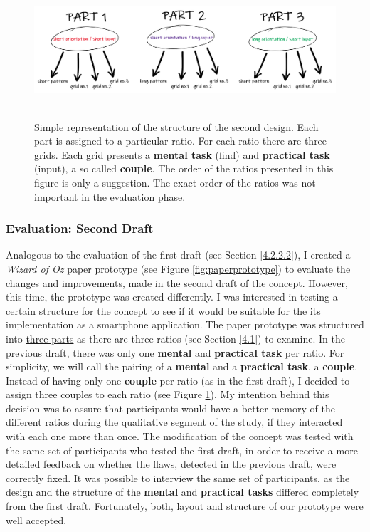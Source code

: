 \begin{figure}[t!]
\centering
\includegraphics[width=13cm, height=5cm]{Chapters/graphics/prototypeStructure.PNG}
\caption{Simple representation of the structure of the second design. Each part is assigned to a particular ratio. For each ratio there are three grids. Each grid presents a \textbf{mental task} (find) and \textbf{practical task} (input), a so called \textbf{couple}. The order of the ratios presented in this figure is only a suggestion. The exact order of the ratios was not important in the evaluation phase.}
\label{fig:prototype}
\end{figure}

\subsubsection{Evaluation: Second Draft} \label{4.2.2.4}

Analogous to the evaluation of the first draft (see Section \ref{4.2.2.2}), I created a \textit{Wizard of Oz} \cite{Butz2014} paper prototype (see Figure \ref{fig:paperprototype}) to evaluate the changes and improvements, made in the second draft of the concept. However, this time, the prototype was created differently. I was interested in testing a certain structure for the concept to see if it would be suitable for the its implementation as a smartphone application. The paper prototype was structured into \underline{three parts} as there are three ratios (see Section \ref{4.1}) to examine. In the previous draft, there was only one \textbf{mental} and \textbf{practical task} per ratio. For simplicity, we will call the pairing of a  \textbf{mental} and a \textbf{practical task}, a \textbf{couple}. Instead of having only one \textbf{couple} per ratio (as in the first draft), I decided to assign three couples to each ratio (see Figure \ref{fig:prototype}). My intention behind this decision was to assure that participants would have a better memory of the different ratios during the qualitative segment of the study, if they interacted with each one more than once. The modification of the concept was tested with the same set of participants who tested the first draft, in order to receive a more detailed feedback on whether the flaws, detected in the previous draft, were correctly fixed. It was possible to interview the same set of participants, as the design and the structure of the \textbf{mental} and \textbf{practical tasks} differed completely from the first draft. Fortunately, both, layout and structure of our prototype were well accepted. \\

